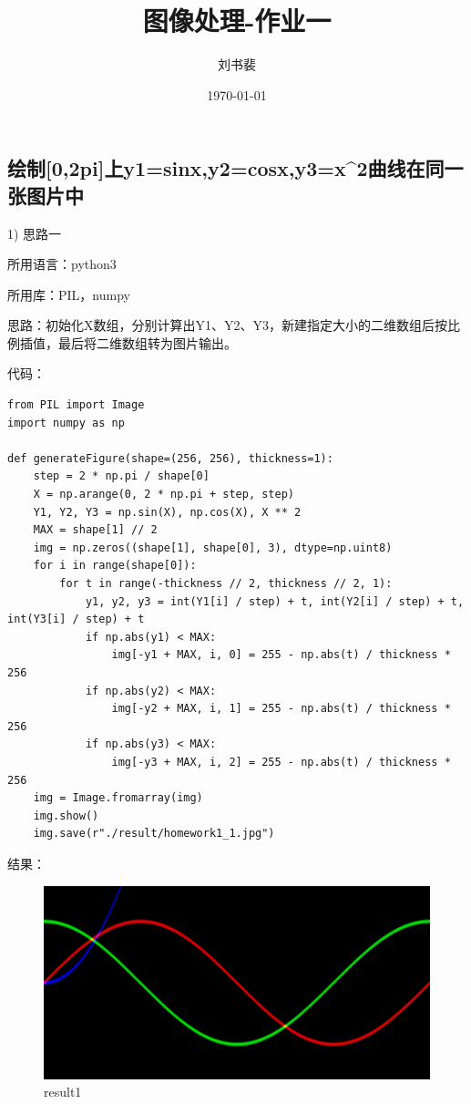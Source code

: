\documentclass{article}
\begin{document}
\begin{CJK*}{UTF8}{song}

\title{{图像处理-作业一}}
\author{刘书裴}
\date{\today}
\maketitle

\section{绘制{[}0,2pi{]}上y1=sinx,y2=cosx,y3=x\^{}2曲线在同一张图片中}

1) 思路一

所用语言：python3

所用库：PIL，numpy

思路：初始化X数组，分别计算出Y1、Y2、Y3，新建指定大小的二维数组后按比例插值，最后将二维数组转为图片输出。

代码：

\begin{lstlisting}
from PIL import Image
import numpy as np

def generateFigure(shape=(256, 256), thickness=1):
    step = 2 * np.pi / shape[0]
    X = np.arange(0, 2 * np.pi + step, step)
    Y1, Y2, Y3 = np.sin(X), np.cos(X), X ** 2
    MAX = shape[1] // 2
    img = np.zeros((shape[1], shape[0], 3), dtype=np.uint8)
    for i in range(shape[0]):
        for t in range(-thickness // 2, thickness // 2, 1):
            y1, y2, y3 = int(Y1[i] / step) + t, int(Y2[i] / step) + t, int(Y3[i] / step) + t
            if np.abs(y1) < MAX:
                img[-y1 + MAX, i, 0] = 255 - np.abs(t) / thickness * 256
            if np.abs(y2) < MAX:
                img[-y2 + MAX, i, 1] = 255 - np.abs(t) / thickness * 256
            if np.abs(y3) < MAX:
                img[-y3 + MAX, i, 2] = 255 - np.abs(t) / thickness * 256
    img = Image.fromarray(img)
    img.show()
    img.save(r"./result/homework1_1.jpg")
\end{lstlisting}

结果：

\begin{figure}[htbp]
    \centering
    \includegraphics[width=0.8\linewidth]{result/homework1_1.jpg}
    \caption{result1}
\end{figure}


\end{CJK*}
\end{document}
